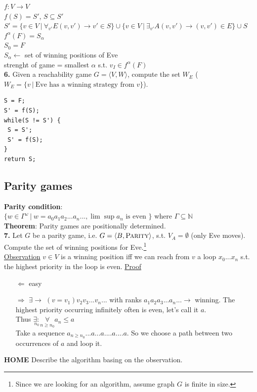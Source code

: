 \noindent
$f : V \rightarrow V$\\
$f(S) = S'$, $S \subseteq S'$\\
$S' = \{v \in V\ |\ \forall_{v'} E(v,v') \rightarrow v' \in S\}
\cup \{v \in V\ |\ \exists_{v'} A(v,v') \rightarrow (v,v') \in E\} \cup S$\\
$f^{\alpha}(F) = S_{\alpha}$\\
$S_0 = F$\\
$S_{\alpha} \leftarrow$ set of winning positions of Eve\\
strenght of game = smallest $\alpha$ s.t. $v_I \in f^{\alpha}(F)$\\

\noindent
\textbf{6.} Given a reachability game $G = \langle V, W \rangle$, compute the set $W_E$ ($W_E = \{v\ |\ \text{Eve has a winning strategy from } v\}$).\\
\begin{lstlisting}
S = F;
S' = f(S);
while(S != S') {
 S = S';
 S' = f(S);
}
return S;
\end{lstlisting}

\subsection*{Parity games}
\textbf{Parity condition}:\\
$\{w \in \Gamma^{\omega}\ |\ w = a_0a_1a_2...a_n..., \lim\sup a_n \text{ is even }\}$ where $\Gamma \subseteq \mathbb{N}$\\
\textbf{Theorem}: Parity games are positionally determined.\\

\noindent
\textbf{7.} Let $G$ be a parity game, i.e. $G = \langle B, \textsc{Parity} \rangle$,
s.t. $V_A = \emptyset$ (only Eve moves). Compute the set of winning positions for Eve.\footnote{Since we are looking for an algorithm, assume graph $G$ is finite in size.}\\
\underline{Observation} $v \in V$ is a winning position iff we can reach from $v$ a loop $x_0...x_n$ s.t. the highest priority in the loop is even.
\underline{Proof}
\begin{itemize}
	\item[$\Leftarrow$] easy
	\item[$\Rightarrow$] $\exists \rightarrow$ $(v=v_1)v_2v_3...v_n...$ with ranks $a_1a_2a_3...a_n... \rightarrow$ winning. The highest priority occurring
	infinitely often is even, let's call it $a$.\\
	Thus $\underset{n_0}{\exists:} \underset{n \geq n_0}{\forall} a_n \leq a$\\
	Take a sequence $a_{n \geq n_0}...a...a....a....a$. So we choose a path between two occurrences of $a$ and loop it.
\end{itemize}
\textbf{HOME} Describe the algorithm basing on the observation.
